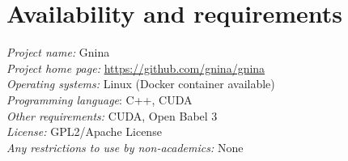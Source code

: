 \documentclass[linenumbers,doublespacing]{bmcart}
\begin{document}

\section*{Availability and requirements}
\textit{Project name:} Gnina \\
\textit{Project home page:} \url{https://github.com/gnina/gnina} \\
\textit{Operating systems:} Linux (Docker container available)\\
\textit{Programming language}: C++, CUDA \\
\textit{Other requirements:} CUDA, Open Babel 3 \\
\textit{License:} GPL2/Apache License \\
\textit{Any restrictions to use by non-academics:} None \\
\end{document}
